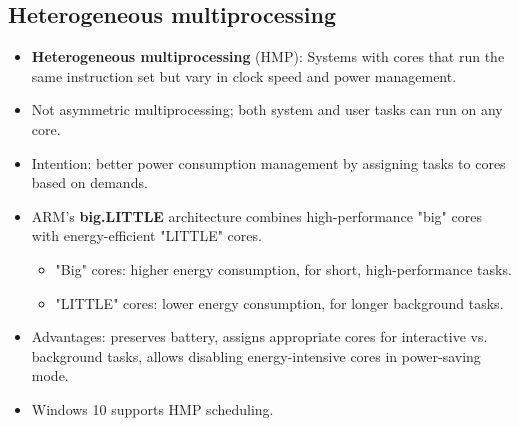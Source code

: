 \subsection{Heterogeneous multiprocessing}
\begin{itemize}
    \item \textbf{Heterogeneous multiprocessing} (HMP): Systems with cores that run the same instruction set but vary in clock speed and power management.
    \item Not asymmetric multiprocessing; both system and user tasks can run on any core.
    \item Intention: better power consumption management by assigning tasks to cores based on demands.
    \item ARM's \textbf{big.LITTLE} architecture combines high-performance "big" cores with energy-efficient "LITTLE" cores.
        \begin{itemize}
            \item "Big" cores: higher energy consumption, for short, high-performance tasks.
            \item "LITTLE" cores: lower energy consumption, for longer background tasks.
        \end{itemize}
    \item Advantages: preserves battery, assigns appropriate cores for interactive vs. background tasks, allows disabling energy-intensive cores in power-saving mode.
    \item Windows 10 supports HMP scheduling.
\end{itemize}

